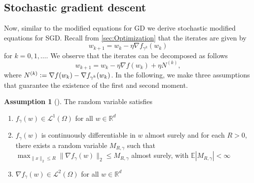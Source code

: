 \documentclass[12pt]{article}
\theoremstyle{definition}
\newtheorem{assumption}[assumption]{Assumption}
\numberwithin{equation}{section}
\newcommand{\norm}[1]{\lVert{#1}\rVert_2}
\newcommand{\defeq}{\vcentcolon=}
\begin{document}
\subsection{Stochastic gradient descent}
Now, similar to the modified equations for GD we derive stochastic modified equations for SGD. 
Recall from \autoref{sec:Optimization} that the iterates are given by
\begin{equation*}
  w_{k+1} = w_{k} - \eta \nabla f_{\gamma^k}(w_{k})
\end{equation*}
for $k = 0,1,\dots$. We observe that the iterates can be decomposed as follows
\begin{equation}
  \label{eq:sgd_decomposition}
  w_{k+1} = w_{k} - \eta \nabla f(w_{k}) + \eta N^{(k)},
\end{equation}
where $N^{(k)} \defeq \nabla f(w_{k}) - \nabla f_{\gamma^k}(w_{k})$.
In the following, we make three assumptions that guarantee the existence of the first and second moment.
\begin{assumption}[]
  \label{as:sde_model}
  The random variable satisfies 
  \begin{enumerate}[label=(\roman*)]
    \item $f_{\gamma}(w) \in \mathcal{L}^1(\Omega)$ for all $w \in \mathbb{R}^d$
    \item \label{as:bounded_gradient} $f_{\gamma}(w)$ is continuously differentiable in $w$ almost surely and for each $R > 0$, there exists a random variable $M_{R,\gamma}$ such that $\max_{\norm{x} \leq R} \norm{ \nabla f_{\gamma}(w) } \leq M_{R,\gamma}$ almost surely, with $\mathbb{E} |M_{R,\gamma}| < \infty$
    \item $\nabla f_{\gamma}(w) \in \mathcal{L}^2(\Omega)$ for all $w \in \mathbb{R}^d$
  \end{enumerate}
\end{assumption}
\end{document}
